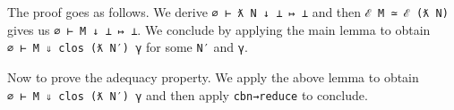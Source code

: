 The proof goes as follows. We derive \texttt{∅\ ⊢\ ƛ\ N\ ↓\ ⊥\ ↦\ ⊥} and
then \texttt{ℰ\ M\ ≃\ ℰ\ (ƛ\ N)} gives us \texttt{∅\ ⊢\ M\ ↓\ ⊥\ ↦\ ⊥}.
We conclude by applying the main lemma to obtain
\texttt{∅\ ⊢\ M\ ⇓\ clos\ (ƛ\ N′)\ γ} for some \texttt{N′} and
\texttt{γ}.

Now to prove the adequacy property. We apply the above lemma to obtain
\texttt{∅\ ⊢\ M\ ⇓\ clos\ (ƛ\ N′)\ γ} and then apply \texttt{cbn→reduce}
to conclude.

\begin{fence}
\begin{code}%
\>[0]\AgdaSpace{}%
\AgdaSymbol{:}\AgdaSpace{}%
\AgdaSpace{}%
\AgdaSymbol{:}\AgdaSpace{}%
\AgdaSpace{}%
\AgdaSpace{}%
\AgdaSymbol{\}\{}\AgdaSpace{}%
\AgdaSymbol{:}\AgdaSpace{}%
\AgdaSpace{}%
\AgdaOperator{\AgdaInductiveConstructor{,}}\AgdaSpace{}%
\AgdaSpace{}%
\AgdaSpace{}%
\AgdaSymbol{\}}\<%
\\
\>[0][@{}l@{\AgdaIndent{0}}]%
\>[3]%
\>[6]\AgdaSpace{}%
\AgdaSpace{}%
\AgdaSpace{}%
\AgdaSpace{}%
\AgdaSymbol{(}\AgdaSpace{}%
\AgdaSymbol{)}\<%
\\
%
\>[3]%
\>[2005I]\AgdaFunction{Σ[}\AgdaSpace{}%
\AgdaSpace{}%
\AgdaSpace{}%
\AgdaSymbol{(}\AgdaSpace{}%
\AgdaOperator{\AgdaInductiveConstructor{,}}\AgdaSpace{}%
\AgdaSpace{}%
\AgdaSpace{}%
\AgdaSymbol{)}\AgdaSpace{}%
\AgdaFunction{]}\<%
\\
\>[.][@{}l@{}]\<[2005I]%
\>[5]\AgdaSymbol{(}\AgdaSpace{}%
\AgdaSpace{}%
\AgdaSpace{}%
\AgdaSymbol{)}\<%
\\
\>[0]\AgdaSymbol{\{}\AgdaSymbol{\}\{}\AgdaSymbol{\}}\AgdaSpace{}%
\<%
\\
\>[0][@{}l@{\AgdaIndent{0}}]%
\>[4]\AgdaSpace{}%
\AgdaSpace{}%
\<%
\\
\>[0]%

\end{code}
\end{fence}
